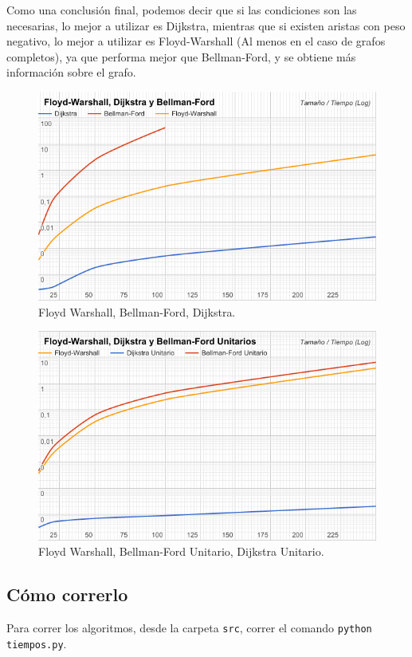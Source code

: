 \documentclass[a4paper,10pt]{article}
\begin{document}
	Como una conclusión final, podemos decir que si las condiciones son las necesarias, lo mejor a utilizar es Dijkstra, mientras que si existen aristas con peso negativo, lo mejor a utilizar es Floyd-Warshall (Al menos en el caso de grafos completos), ya que performa mejor que Bellman-Ford, y se obtiene más información sobre el grafo.

	\begin{figure}[!htb]
		\centering
		\includegraphics[scale=0.5]{images/grafico-fw-bf-d.png}
		\caption{Floyd Warshall, Bellman-Ford, Dijkstra.}
		\label{fig:fw-bf-d}
	\end{figure}

	\begin{figure}[!htb]
		\centering
		\includegraphics[scale=0.5]{images/grafico-fw-bfu-du.png}
		\caption{Floyd Warshall, Bellman-Ford Unitario, Dijkstra Unitario.}
		\label{fig:fw-bfu-du}
	\end{figure}

\subsection{Cómo correrlo}
	Para correr los algoritmos, desde la carpeta \texttt{src}, correr el comando \texttt{python tiempos.py}.
\end{document}
